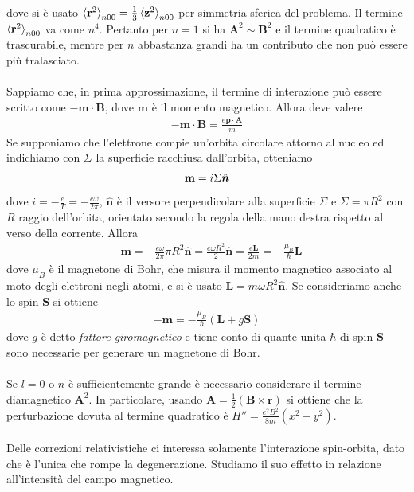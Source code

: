 \documentclass{article}
\begin{document}
dove si è usato $\braket{\mathbf{r}^2}_{n00} = \frac{1}{3}\braket{\mathbf{z}^2}_{n00}$ per simmetria sferica del problema. Il termine $\braket{\mathbf{r}^2}_{n00}$ va come $n^4$. Pertanto per $n = 1$ si ha $\mathbf{A}^2 \sim \mathbf{B}^2$ e il termine quadratico è trascurabile, mentre per $n$ abbastanza grandi ha un contributo che non può essere più tralasciato. \\ \\
Sappiamo che, in prima approssimazione, il termine di interazione può essere scritto come $-\mathbf{m} \cdot \mathbf{B}$, dove $\mathbf{m}$ è il momento magnetico. Allora deve valere 
\begin{align}
    -\mathbf{m} \cdot \mathbf{B} = \frac{e\mathbf{p} \cdot \mathbf{A}}{m} \tag{1.4.5}
\end{align}
Se supponiamo che l'elettrone compie un'orbita circolare attorno al nucleo ed indichiamo con $\Sigma$ la superficie racchiusa dall'orbita, otteniamo 
\begin{align}
    \mathbf{m} = i\Sigma \hat{\boldsymbol{n}} \notag
\end{align}
dove $i = -\frac{e}{T} = -\frac{e\omega}{2\pi}$, $\hat{\boldsymbol{n}}$ è il versore perpendicolare alla superficie $\Sigma$ e $\Sigma = \pi R^2$ con $R$ raggio dell'orbita, orientato secondo la regola della mano destra rispetto al verso della corrente. Allora 
\begin{align}
    -\mathbf{m} = -\frac{e\omega}{2\pi}\pi R^2 \hat{\boldsymbol{n}} = \frac{e\omega R^2}{2}\hat{\boldsymbol{n}} = \frac{e\mathbf{L}}{2m} = -\frac{\mu_B}{\hbar}\mathbf{L} \tag{1.4.6}
\end{align}
dove $\mu_B$ è il magnetone di Bohr, che misura il momento magnetico associato al moto degli elettroni negli atomi, e si è usato $\mathbf{L} = m\omega R^2\hat{\boldsymbol{n}}$. Se consideriamo anche lo spin $\mathbf{S}$ si ottiene 
\begin{align}
    -\mathbf{m} = -\frac{\mu_B}{\hbar}(\mathbf{L} + g\mathbf{S}) \tag{1.4.7}
\end{align}
dove $g$ è detto \textit{fattore giromagnetico} e tiene conto di quante unita $\hbar$ di spin $\mathbf{S}$ sono necessarie per generare un magnetone di Bohr. \\ \\
Se $l = 0$ o $n$ è sufficientemente grande è necessario considerare il termine diamagnetico $\mathbf{A}^2$. In particolare, usando $\mathbf{A} = \frac{1}{2}(\mathbf{B} \times \mathbf{r})$ si ottiene che la perturbazione dovuta al termine quadratico è $H'' = \frac{e^2B^2}{8m}(x^2 + y^2)$. \\ \\
Delle correzioni relativistiche ci interessa solamente l'interazione spin-orbita, dato che è l'unica che rompe la degenerazione. Studiamo il suo effetto in relazione all'intensità del campo magnetico.
\end{document}
